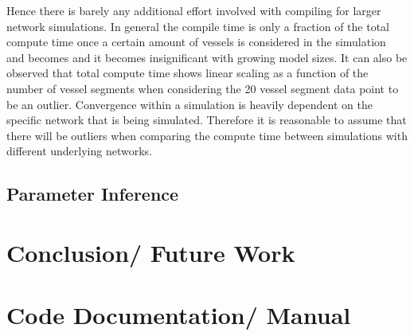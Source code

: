 \documentclass[a4paper, oneside]{discothesis}
\begin{document}
Hence there is barely any additional effort involved with compiling for larger network simulations.
In general the compile time is only a fraction of the total compute time once a certain amount of vessels is considered in the simulation and becomes and it becomes insignificant with growing model sizes.
It can also be observed that total compute time shows linear scaling as a function of the number of vessel segments when considering the 20 vessel segment data point to be an outlier.
Convergence within a simulation is heavily dependent on the specific network that is being simulated.
Therefore it is reasonable to assume that there will be outliers when comparing the compute time between simulations with different underlying networks.


\section{Parameter Inference} \label{sec:pi}

\chapter{Conclusion/ Future Work}





\appendix
\chapter{Code Documentation/ Manual} 
\end{document}
